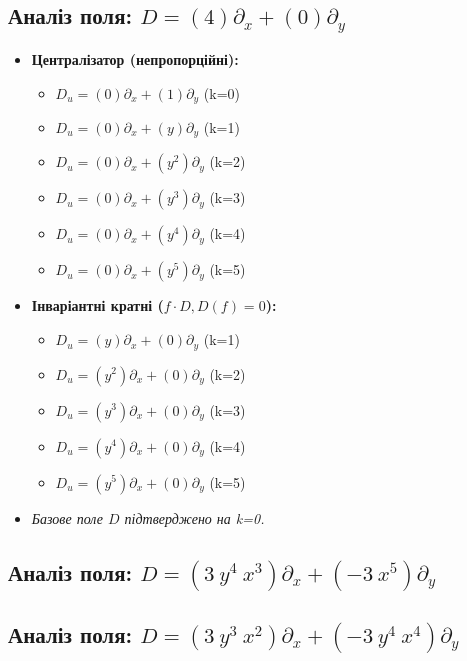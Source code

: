 \subsection*{Аналіз поля: $ D = (4)\partial_x + (0)\partial_y $}
\begin{itemize}[leftmargin=1cm]
  \item \textbf{Централізатор (непропорційні):}
    \begin{itemize}
      \item $ D_u = (0)\partial_x + (1)\partial_y $ (k=0)
      \item $ D_u = (0)\partial_x + (y)\partial_y $ (k=1)
      \item $ D_u = (0)\partial_x + (y^{2})\partial_y $ (k=2)
      \item $ D_u = (0)\partial_x + (y^{3})\partial_y $ (k=3)
      \item $ D_u = (0)\partial_x + (y^{4})\partial_y $ (k=4)
      \item $ D_u = (0)\partial_x + (y^{5})\partial_y $ (k=5)
    \end{itemize}
  \item \textbf{Інваріантні кратні ($f \cdot D, D(f)=0$):}
    \begin{itemize}
      \item $ D_u = (y)\partial_x + (0)\partial_y $ (k=1)
      \item $ D_u = (y^{2})\partial_x + (0)\partial_y $ (k=2)
      \item $ D_u = (y^{3})\partial_x + (0)\partial_y $ (k=3)
      \item $ D_u = (y^{4})\partial_x + (0)\partial_y $ (k=4)
      \item $ D_u = (y^{5})\partial_x + (0)\partial_y $ (k=5)
    \end{itemize}
  \item \textit{Базове поле $D$ підтверджено на k=0.}
\end{itemize}
\hrulefill
\subsection*{Аналіз поля: $ D = (3 ~ y^{4} ~ x^{3})\partial_x + ( - 3 ~ x^{5})\partial_y $}
\begin{itemize}[leftmargin=1cm]
\end{itemize}
\hrulefill
\subsection*{Аналіз поля: $ D = (3 ~ y^{3} ~ x^{2})\partial_x + ( - 3 ~ y^{4} ~ x^{4})\partial_y $}
\begin{itemize}[leftmargin=1cm]
\end{itemize}
\hrulefill
